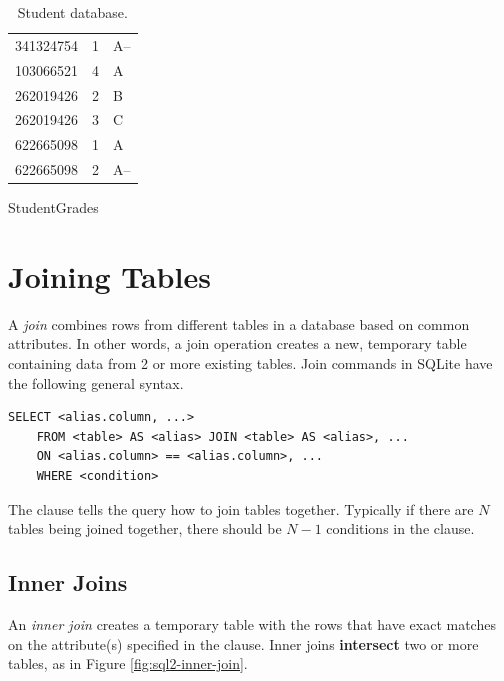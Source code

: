 \begin{table}[H]
\begin{subtable}{.35\textwidth}
\begin{tabular}{|l|l|l|}
        341324754 & 1 & A-- \\
        103066521 & 4 & A \\
        262019426 & 2 & B \\
        262019426 & 3 & C \\
        622665098 & 1 & A \\
        622665098 & 2 & A-- \\ \hline
    \end{tabular}
    \caption{StudentGrades}
    \label{table:sql1-student-grades}
\end{subtable}
\caption{Student database.}
\end{table}

\section*{Joining Tables} %

A \emph{join} combines rows from different tables in a database based on common attributes.
In other words, a join operation creates a new, temporary table containing data from 2 or more existing tables.
Join commands in SQLite have the following general syntax.
\begin{lstlisting}
SELECT <alias.column, ...>
    FROM <table> AS <alias> JOIN <table> AS <alias>, ...
    ON <alias.column> == <alias.column>, ...
    WHERE <condition>
\end{lstlisting}

The  clause tells the query how to join tables together.
Typically if there are $N$ tables being joined together, there should be $N-1$ conditions in the  clause.

\subsection*{Inner Joins} %

An \emph{inner join} creates a temporary table with the rows that have exact matches on the attribute(s) specified in the  clause.
Inner joins \textbf{intersect} two or more tables, as in Figure \ref{fig:sql2-inner-join}.

